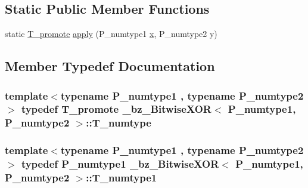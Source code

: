 \subsection*{Static Public Member Functions}
\begin{DoxyCompactItemize}
\item 
static \hyperlink{minmax_8h_aaa88a440c2f0d00798d5b1d42c79308d}{T\+\_\+promote} \hyperlink{class__bz__BitwiseXOR_ad0f4bd0390635e09f9ec4022c7a6ede5}{apply} (P\+\_\+numtype1 \hyperlink{vecnorm1_8cc_ac73eed9e41ec09d58f112f06c2d6cb63}{x}, P\+\_\+numtype2 y)
\end{DoxyCompactItemize}


\subsection{Member Typedef Documentation}
\hypertarget{class__bz__BitwiseXOR_a1988b438bfd839be85a9b73ad7c3be6b}{}
\subsubsection[{T\+\_\+numtype}]{\setlength{\rightskip}{0pt plus 5cm}template$<$typename P\+\_\+numtype1 , typename P\+\_\+numtype2 $>$ typedef {\bf T\+\_\+promote} {\bf \+\_\+bz\+\_\+\+Bitwise\+X\+O\+R}$<$ P\+\_\+numtype1, P\+\_\+numtype2 $>$\+::{\bf T\+\_\+numtype}}\label{class__bz__BitwiseXOR_a1988b438bfd839be85a9b73ad7c3be6b}
\hypertarget{class__bz__BitwiseXOR_a4e7363bbe2dcf25627569307102acc14}{}
\subsubsection[{T\+\_\+numtype1}]{\setlength{\rightskip}{0pt plus 5cm}template$<$typename P\+\_\+numtype1 , typename P\+\_\+numtype2 $>$ typedef P\+\_\+numtype1 {\bf \+\_\+bz\+\_\+\+Bitwise\+X\+O\+R}$<$ P\+\_\+numtype1, P\+\_\+numtype2 $>$\+::{\bf T\+\_\+numtype1}}\label{class__bz__BitwiseXOR_a4e7363bbe2dcf25627569307102acc14}
\hypertarget{class__bz__BitwiseXOR_ad8ea4ae9bf0ad007b9f739ab6d874e7a}{}

